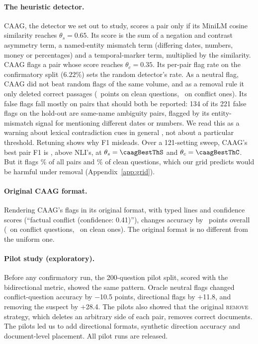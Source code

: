 \paragraph{The heuristic detector.}
CAAG, the detector we set out to study, scores a pair only if its MiniLM \citep{reimers2019sbert} cosine similarity reaches $\theta_s=0.65$. Its score
is the sum of a negation and contrast asymmetry term, a named-entity mismatch term (differing dates, numbers, money or
percentages) and a temporal-marker term, multiplied by the similarity. CAAG flags a pair whose score reaches
$\theta_c=0.35$. Its per-pair flag rate on the confirmatory split ($6.22\%$) sets the random detector's rate.
As a neutral flag, CAAG did not beat random flags of the same volume, and
as a removal rule it only deleted correct passages (\dCaagRemClean\ points on clean questions, \dCaagRemConf\ on
conflict ones). Its false flags fall mostly on pairs that should both be reported: 134 of its 221 false flags on the
hold-out are same-name ambiguity pairs, flagged by its entity-mismatch signal for mentioning different dates or
numbers. We read this as a warning about lexical contradiction cues in general \citep{gururangan2018annotation},
not about a particular threshold. Retuning shows why F1 misleads. Over a 121-setting sweep, CAAG's
best pair F1 is \caagBestFOne, above NLI's, at $\theta_s=\caagBestThS$ and $\theta_c=\caagBestThC$. But it flags \caagBestRate\% of all pairs and \caagBestCleanFpr\% of clean questions, which our grid predicts
would be harmful under removal (Appendix~\ref{app:grid}).

\paragraph{Original CAAG format.}
Rendering CAAG's flags in its original format, with typed lines and confidence scores (``factual conflict (confidence:
0.41)''), changes accuracy by \origCaagAll\ points overall (\origCaagConf\ on conflict questions, \origCaagClean\ on
clean ones). The original format is no different from the uniform one.

\paragraph{Pilot study (exploratory).}
Before any confirmatory run, the 200-question pilot split, scored with the bidirectional metric, showed the same
pattern. Oracle neutral flags changed conflict-question accuracy by $-$10.5 points, directional flags by
$+$11.8, and removing the suspect by $+$28.4. The pilots also showed that the original \textsc{remove} strategy,
which deletes an arbitrary side of each pair, removes correct documents. The pilots led us to add directional formats,
synthetic direction accuracy and document-level placement. All pilot runs are released.


